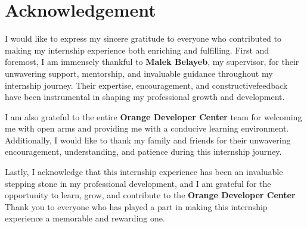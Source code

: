\chapter*{Acknowledgement}

I would like to express my sincere gratitude to everyone who contributed
to making my internship experience both enriching and fulfilling.
First and foremost, I am immensely thankful to \textbf{Malek Belayeb},
my supervisor, for their unwavering support, mentorship, and invaluable
guidance throughout my internship journey. Their expertise, encouragement,
and constructivefeedback have been instrumental in shaping my professional growth
and development.\bigskip

I am also grateful to the entire \textbf{Orange Developer Center} team for welcoming me with open arms
and providing me with a conducive learning environment.
Additionally, I would like to thank my family and friends for their unwavering encouragement,
understanding, and patience during this internship journey.\bigskip

Lastly, I acknowledge that this internship experience has been an invaluable stepping stone in
my professional development, and I am grateful for the opportunity to learn, grow,
and contribute to the \textbf{Orange Developer Center} Thank you to everyone
who has played a part in making this internship experience a memorable and rewarding one.
